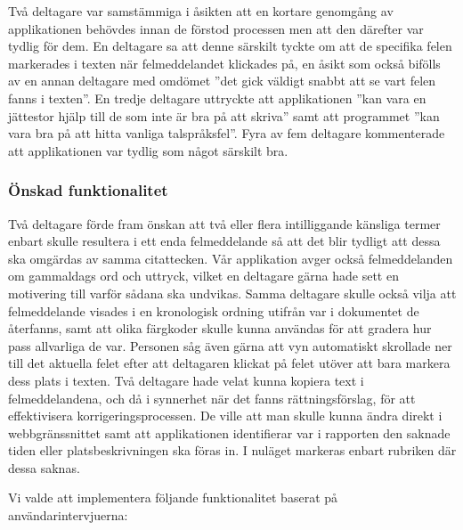 \documentclass[swedish]{maucsthesis}
\begin{document}
Två deltagare var samstämmiga i åsikten att en kortare genomgång av
applikationen behövdes innan de förstod processen men att den därefter var
tydlig för dem. En deltagare sa att denne särskilt tyckte om att de specifika
felen markerades i texten när felmeddelandet klickades på, en åsikt som också
bifölls av en annan deltagare med omdömet ”det gick väldigt snabbt att se vart
felen fanns i texten”. En tredje deltagare uttryckte att applikationen ”kan vara
en jättestor hjälp till de som inte är bra på att skriva” samt att programmet
”kan vara bra på att hitta vanliga talspråksfel”. Fyra av fem deltagare
kommenterade att applikationen var tydlig som något särskilt bra.

\subsubsection{Önskad funktionalitet}\label{önskvärdafunktioner}

Två deltagare förde fram önskan att två eller flera intilliggande känsliga
termer enbart skulle resultera i ett enda felmeddelande så att det blir tydligt
att dessa ska omgärdas av samma citattecken. Vår applikation avger också
felmeddelanden om gammaldags ord och uttryck, vilket en deltagare gärna hade
sett en motivering till varför sådana ska undvikas. Samma deltagare skulle också
vilja att felmeddelande visades i en kronologisk ordning utifrån var i
dokumentet de återfanns, samt att olika färgkoder skulle kunna användas för att
gradera hur pass allvarliga de var. Personen såg även gärna att vyn automatiskt
skrollade ner till det aktuella felet efter att deltagaren klickat på felet
utöver att bara markera dess plats i texten. Två deltagare hade velat kunna
kopiera text i felmeddelandena, och då i synnerhet när det fanns
rättningsförslag, för att effektivisera korrigeringsprocessen. De ville att man
skulle kunna ändra direkt i webbgränssnittet samt att applikationen identifierar
var i rapporten den saknade tiden eller platsbeskrivningen ska föras in. I
nuläget markeras enbart rubriken där dessa saknas.

Vi valde att implementera följande funktionalitet baserat på
användarintervjuerna:
\end{document}

